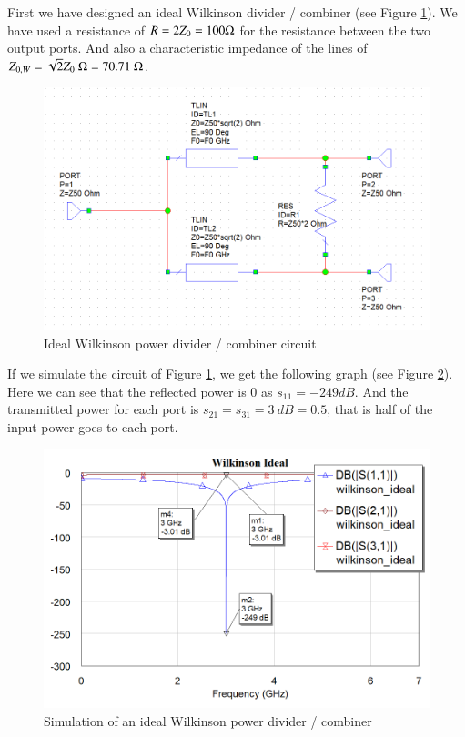\documentclass[12pt]{report} %
\begin{document}
First we have designed an ideal Wilkinson divider / combiner (see Figure \ref{fig:microstrip_elements:wilkinson_ideal_circuit}). We have used a resistance of $R = 2 \* Z_0 = 100 \Omega$ for the resistance between the two output ports. And also a characteristic impedance of the lines of $Z_{0,W} = \sqrt{2} \* Z_0 \ \Omega = 70.71 \ \Omega$.

\begin{figure}[htbp]
    \centering
    \includegraphics[width=\linewidth]{images/microstrip_elements/wilkinson_ideal_circuit.png}
    \caption{Ideal Wilkinson power divider / combiner circuit}
    \label{fig:microstrip_elements:wilkinson_ideal_circuit}
\end{figure}

If we simulate the circuit of Figure \ref{fig:microstrip_elements:wilkinson_ideal_circuit}, we get the following graph (see Figure \ref{fig:microstrip_elements:wilkinson_ideal_graph}). Here we can see that the reflected power is 0 as $s_{11} = - 249 dB$. And the transmitted power for each port is $s_{21} = s_{31} = 3 \ dB = 0.5$, that is half of the input power goes to each port.

\begin{figure}[htbp]
    \centering
    \includegraphics[width=1\linewidth]{images//microstrip_elements/wilkinson_ideal_graph.png}
    \caption{Simulation of an ideal Wilkinson power divider / combiner}
    \label{fig:microstrip_elements:wilkinson_ideal_graph}
\end{figure}
\end{document}
